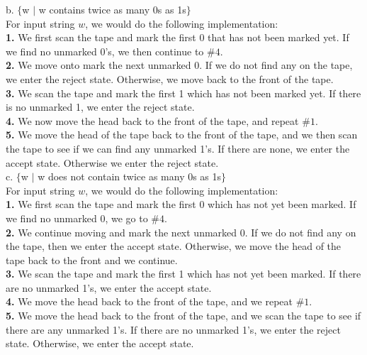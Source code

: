 \documentclass[12pt]{article}
\begin{document}
b. $\{$w $\mid$ w contains twice as many 0s as 1s$\}$ \\

For input string $w$, we would do the following implementation: \\
\textbf{1.} We first scan the tape and mark the first 0 that has not been marked yet.
If we find no unmarked 0's, we then continue to $\#4$. \\

\textbf{2.} We move onto mark the next unmarked 0. If we do not find any on the tape,
we enter the reject state. Otherwise, we move back to the front of the tape. \\

\textbf{3.} We scan the tape and mark the first 1 which has not been marked yet. If there
is no unmarked 1, we enter the reject state. \\

\textbf{4.} We now move the head back to the front of the tape, and repeat $\#1$. \\

\textbf{5.} We move the head of the tape back to the front of the tape, and we then scan
the tape to see if we can find any unmarked 1's. If there are none, we enter the
accept state. Otherwise we enter the reject state. \\

c. $\{$w $\mid$ w does not contain twice as many 0s as 1s$\}$ \\

For input string $w$, we would do the following implementation: \\

\textbf{1.} We first scan the tape and mark the first 0 which has not yet been marked.
If we find no unmarked 0, we go to $\#4$. \\

\textbf{2.} We continue moving and mark the next unmarked 0. If we do not find any on
the tape, then we enter the accept state. Otherwise, we move the head of the tape back
to the front and we continue. \\

\textbf{3.} We scan the tape and mark the first 1 which has not yet been marked. If 
there are no unmarked 1's, we enter the accept state. \\

\textbf{4.} We move the head back to the front of the tape, and we repeat $\#1$. \\

\textbf{5.} We move the head back to the front of the tape, and we scan the tape
to see if there are any unmarked 1's. If there are no unmarked 1's, we enter the 
reject state. Otherwise, we enter the accept state. \\
\end{document}
